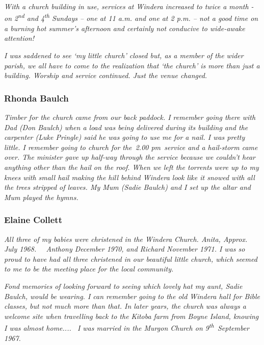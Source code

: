 \emph{With a church building in use, services at Windera increased to twice a month - on 2\textsuperscript{nd} and 4\textsuperscript{th} Sundays -- one at 11 a.m. and one at 2 p.m. -- not a good time on a burning hot summer's afternoon and certainly not conducive to wide-awake attention!}



\emph{I was saddened to see `my little church' closed but, as a member of the wider parish, we all have to come to the realization that `the church' is more than just a building. Worship and service continued. Just the venue changed.}



\subsubsection{Rhonda Baulch}



\emph{Timber for the church came from our back paddock. I remember going there with Dad (Don Baulch) when a load was being delivered during its building and the carpenter (Luke Pringle) said he was going to use me for a nail. I was pretty little. I remember going to church for the~2.00 pm~service and a hail-storm came over. The minister gave up half-way through the service because we couldn't hear anything other than the hail on the roof. When we left the torrents were up to my knees with small hail making the hill behind Windera look like it snowed with all the trees stripped of leaves. My Mum (Sadie Baulch) and I set up the altar and Mum played the hymns.}



\subsubsection{Elaine Collett}



\emph{All three of my babies were christened in the Windera Church. Anita, Approx. July 1968.~~ Anthony December 1970, and Richard November 1971. I was so proud to have had all three christened in our beautiful little church, which seemed to me to be the meeting place for the local community.}



\emph{Fond memories of looking forward to seeing which lovely hat my aunt, Sadie Baulch, would be wearing. I can remember going to the old Windera hall for Bible classes, but not much more than that. In later years, the church was always a welcome site when travelling back to the Kitoba farm from Boyne Island, knowing I was almost home.... ~I was married in the Murgon Church on 9\textsuperscript{th}~September 1967.}



